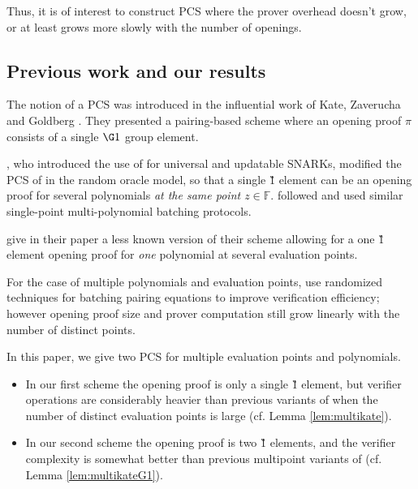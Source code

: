 \documentclass[11pt]{article} %
\newcommand{\F}{\ensuremath{\mathbb F}\xspace}
\begin{document}
Thus, it is of interest to construct PCS where the prover overhead doesn't grow, or at least grows more slowly with the number of openings.


\subsection{Previous work and our results}

The notion of a PCS was introduced in the influential work of Kate, Zaverucha and Goldberg \cite{kate}. They presented a pairing-based scheme where an opening proof $\pi$ consists of a single $\G1$ group element.

\cite{sonic}, who introduced the use of \cite{kate} for universal and updatable SNARKs, modified the PCS of \cite{kate} in the random oracle model, so that a single \G1 element can be an opening proof for several polynomials \emph{at the same point $z\in \F$}. \cite{auroralight,marlin,plonk} followed and used similar single-point multi-polynomial batching protocols.

\cite{kate} give in their paper a less known version of their scheme allowing for a one \G1 element opening proof for \emph{one} polynomial at several evaluation points.

For the case of multiple polynomials and evaluation points, \cite{marlin,plonk} use randomized techniques for batching pairing equations to improve verification efficiency; however opening proof size and prover computation still grow linearly with the number of distinct points.



In this paper, we give two PCS for multiple evaluation points and polynomials.
\begin{itemize}
 \item In our first scheme the opening proof is only a single \G1 element, but verifier operations are considerably heavier than previous variants of \cite{kate} when the number of distinct evaluation points is large (cf. Lemma \ref{lem:multikate}).
\item In our second scheme the opening proof is two \G1 elements, and the verifier complexity is somewhat better than previous multipoint variants of \cite{kate} (cf. Lemma \ref{lem:multikateG1}).
 \end{itemize}
\end{document}
